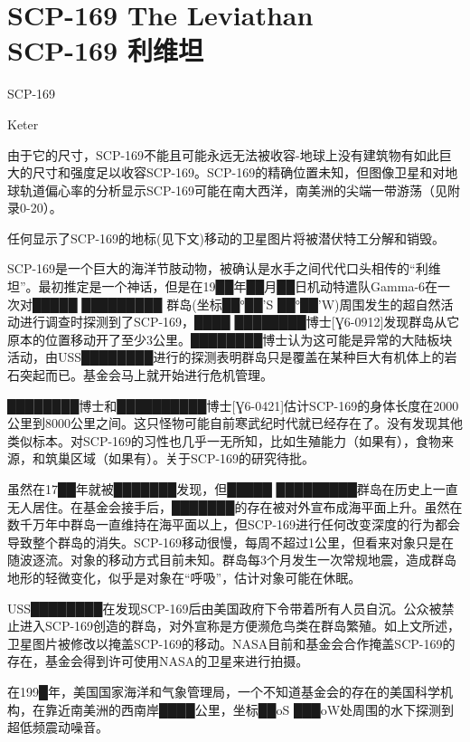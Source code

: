 \chapter[SCP-169 利维坦]{
    SCP-169 The Leviathan\\
    SCP-169 利维坦
}

\label{chap:SCP-169}

SCP-169

Keter

由于它的尺寸，SCP-169不能且可能永远无法被收容-地球上没有建筑物有如此巨大的尺寸和强度足以收容SCP-169。SCP-169的精确位置未知，但图像卫星和对地球轨道偏心率的分析显示SCP-169可能在南大西洋，南美洲的尖端一带游荡（见附录0-20）。

任何显示了SCP-169的地标(见下文)移动的卫星图片将被潜伏特工分解和销毁。

SCP-169是一个巨大的海洋节肢动物，被确认是水手之间代代口头相传的“利维坦”。最初推定是一个神话，但是在19██年██月██日机动特遣队Gamma-6在一次对█████ █████████ 群岛(坐标██°██'S ██°██'W)周围发生的超自然活动进行调查时探测到了SCP-169，████ ████████博士{[}Ɣ6-0912]发现群岛从它原本的位置移动开了至少3公里。████████博士认为这可能是异常的大陆板块活动，由USS████████进行的探测表明群岛只是覆盖在某种巨大有机体上的岩石突起而已。基金会马上就开始进行危机管理。

████████博士和██████████博士{[}Ɣ6-0421]估计SCP-169的身体长度在2000公里到8000公里之间。这只怪物可能自前寒武纪时代就已经存在了。没有发现其他类似标本。对SCP-169的习性也几乎一无所知，比如生殖能力（如果有），食物来源，和筑巢区域（如果有）。关于SCP-169的研究待批。

虽然在17██年就被███████发现，但█████ █████████群岛在历史上一直无人居住。在基金会接手后，███████的存在被对外宣布成海平面上升。虽然在数千万年中群岛一直维持在海平面以上，但SCP-169进行任何改变深度的行为都会导致整个群岛的消失。SCP-169移动很慢，每周不超过1公里，但看来对象只是在随波逐流。对象的移动方式目前未知。群岛每3个月发生一次常规地震，造成群岛地形的轻微变化，似乎是对象在“呼吸”，估计对象可能在休眠。

USS████████在发现SCP-169后由美国政府下令带着所有人员自沉。公众被禁止进入SCP-169创造的群岛，对外宣称是方便濒危鸟类在群岛繁殖。如上文所述，卫星图片被修改以掩盖SCP-169的移动。NASA目前和基金会合作掩盖SCP-169的存在，基金会得到许可使用NASA的卫星来进行拍摄。

在199█年，美国国家海洋和气象管理局，一个不知道基金会的存在的美国科学机构，在靠近南美洲的西南岸████公里，坐标██oS ███oW处周围的水下探测到超低频震动噪音。

